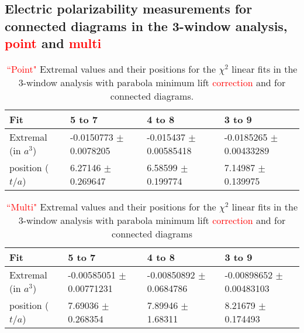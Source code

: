 \subsection{Electric polarizability measurements for connected diagrams in the 
3-window analysis, \textcolor{red}{point} and \textcolor{red}{multi}}
\begin{table}[H]
\begin{center}
    \begin{tabular}{ | l | p{2.2cm} | p{2.2cm} | p{2.2cm} |}
    \hline
     Fit & 5 to 7   &4 to 8   & 3 to 9  \\ \hline
     Extremal (in $a^3$)&   -0.0150773 $\pm$ 0.0078205   &   -0.015437 $\pm$ 0.00585418   &  -0.0185265 $\pm$ 0.00433289   \\ \hline
     position ($t/a$)&  6.27146 $\pm$ 0.269647  &  6.58599 $\pm$ 0.199774    &  7.14987 $\pm$ 0.139975    \\ \hline
    \end{tabular}
\end{center}
\caption{\textcolor{red}{``Point"} Extremal values and their positions for the $\chi^2$ linear 
fits in the 3-window analysis with parabola minimum lift \textcolor{red}{correction} and for connected diagrams.}
\label{Table:ConnectedPoint}
\end{table}

\begin{table}[H]
\begin{center}
    \begin{tabular}{ | l | p{2.2cm} | p{2.2cm} | p{2.2cm} |}
    \hline
     Fit & 5 to 7   &4 to 8   & 3 to 9  \\ \hline
     Extremal (in $a^3$)&   -0.00585051 $\pm$ 0.00771231   &  -0.00850892 $\pm$ 0.0684786   &  -0.00898652 $\pm$ 0.00483103   \\ \hline
     position ($t/a$)&  7.69036 $\pm$ 0.268354   &  7.89946 $\pm$ 1.68311   &   8.21679 $\pm$ 0.174493    \\ \hline
    \end{tabular}
\end{center}
\caption{\textcolor{red}{``Multi"} Extremal values and their positions for the $\chi^2$ linear 
fits in the 3-window analysis with parabola minimum lift \textcolor{red}{correction} and for connected diagrams}
\label{Table:ConnectedMulti}
\end{table}

